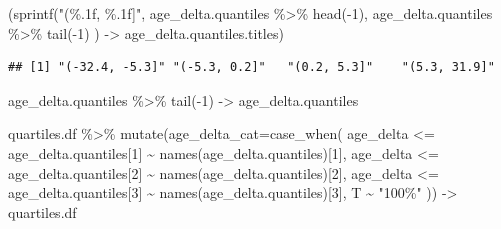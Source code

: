 \documentclass[
]{article}
\newenvironment{Shaded}{\begin{snugshade}}{\end{snugshade}}
\newcommand{\AttributeTok}[1]{\textcolor[rgb]{0.77,0.63,0.00}{#1}}
\newcommand{\DecValTok}[1]{\textcolor[rgb]{0.00,0.00,0.81}{#1}}
\newcommand{\FunctionTok}[1]{\textcolor[rgb]{0.00,0.00,0.00}{#1}}
\newcommand{\NormalTok}[1]{#1}
\newcommand{\OtherTok}[1]{\textcolor[rgb]{0.56,0.35,0.01}{#1}}
\newcommand{\SpecialCharTok}[1]{\textcolor[rgb]{0.00,0.00,0.00}{#1}}
\newcommand{\StringTok}[1]{\textcolor[rgb]{0.31,0.60,0.02}{#1}}
\begin{document}
\begin{Shaded}
\begin{Highlighting}[]
\NormalTok{(}\FunctionTok{sprintf}\NormalTok{(}\StringTok{"(\%.1f, \%.1f]"}\NormalTok{,}
\NormalTok{        age\_delta.quantiles }\SpecialCharTok{\%\textgreater{}\%} \FunctionTok{head}\NormalTok{(}\SpecialCharTok{{-}}\DecValTok{1}\NormalTok{),}
\NormalTok{        age\_delta.quantiles }\SpecialCharTok{\%\textgreater{}\%} \FunctionTok{tail}\NormalTok{(}\SpecialCharTok{{-}}\DecValTok{1}\NormalTok{)}
\NormalTok{        ) }\OtherTok{{-}\textgreater{}}\NormalTok{ age\_delta.quantiles.titles)}
\end{Highlighting}
\end{Shaded}

\begin{verbatim}
## [1] "(-32.4, -5.3]" "(-5.3, 0.2]"   "(0.2, 5.3]"    "(5.3, 31.9]"
\end{verbatim}

\begin{Shaded}
\begin{Highlighting}[]
\NormalTok{age\_delta.quantiles }\SpecialCharTok{\%\textgreater{}\%} \FunctionTok{tail}\NormalTok{(}\SpecialCharTok{{-}}\DecValTok{1}\NormalTok{) }\OtherTok{{-}\textgreater{}}\NormalTok{ age\_delta.quantiles}
\end{Highlighting}
\end{Shaded}

\begin{Shaded}
\begin{Highlighting}[]
\NormalTok{quartiles.df }\SpecialCharTok{\%\textgreater{}\%} 
  \FunctionTok{mutate}\NormalTok{(}\AttributeTok{age\_delta\_cat=}\FunctionTok{case\_when}\NormalTok{(}
\NormalTok{    age\_delta }\SpecialCharTok{\textless{}=}\NormalTok{ age\_delta.quantiles[}\DecValTok{1}\NormalTok{] }\SpecialCharTok{\textasciitilde{}} \FunctionTok{names}\NormalTok{(age\_delta.quantiles)[}\DecValTok{1}\NormalTok{],}
\NormalTok{    age\_delta }\SpecialCharTok{\textless{}=}\NormalTok{ age\_delta.quantiles[}\DecValTok{2}\NormalTok{] }\SpecialCharTok{\textasciitilde{}} \FunctionTok{names}\NormalTok{(age\_delta.quantiles)[}\DecValTok{2}\NormalTok{],}
\NormalTok{    age\_delta }\SpecialCharTok{\textless{}=}\NormalTok{ age\_delta.quantiles[}\DecValTok{3}\NormalTok{] }\SpecialCharTok{\textasciitilde{}} \FunctionTok{names}\NormalTok{(age\_delta.quantiles)[}\DecValTok{3}\NormalTok{],}
\NormalTok{    T }\SpecialCharTok{\textasciitilde{}} \StringTok{"100\%"}
\NormalTok{  )) }\OtherTok{{-}\textgreater{}} 
\NormalTok{  quartiles.df}
\end{Highlighting}
\end{Shaded}
\end{document}
